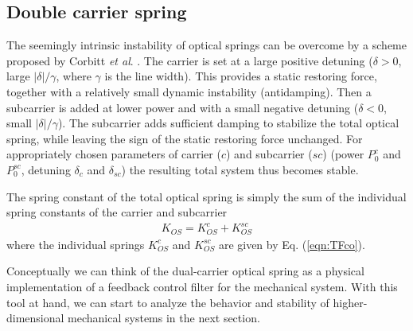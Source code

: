 \subsection{Double carrier spring}

The seemingly intrinsic instability of optical springs can be overcome by a scheme 
proposed by Corbitt \emph{et al}. \cite{Corbitt07}. The carrier is set at a large positive detuning ($\delta>0$, large $|\delta|/\gamma$, where $\gamma$ is the line width). This provides a static restoring force, together with a relatively small dynamic instability (antidamping). Then a subcarrier is added at lower power and with a small negative detuning ($\delta<0$, small $|\delta|/\gamma$). The subcarrier adds sufficient damping to stabilize the total optical spring, while leaving the sign of the static restoring force unchanged.
For appropriately chosen parameters of carrier ($c$) and subcarrier ($sc$) (power $P_0^c$ and $P_0^{sc}$, detuning  $\delta_c$ and $\delta_{sc}$) the resulting total system thus becomes stable.

The spring constant of the total optical spring is simply the sum of the individual spring constants of the carrier and subcarrier
\begin{align}
\label{eqn:KOSsum}
K_{OS}=K_{OS}^c+K_{OS}^{sc}
\end{align}
where the individual springs $K_{OS}^c$ and $K_{OS}^{sc}$ are given by Eq. (\ref{eqn:TFco}).


Conceptually we can think of the dual-carrier optical spring as a physical implementation of a feedback control filter for the mechanical system. With this tool at hand, we can start to analyze the behavior and stability of higher-dimensional mechanical systems in the next section.


